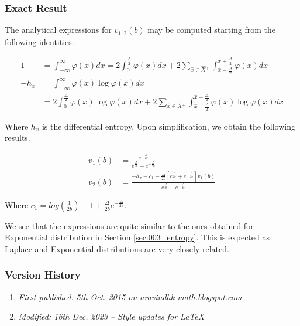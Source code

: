\subsubsection{Exact Result}

The analytical expressions for $v_{1,2}(b)$ may be computed starting from the following identities.

\begin{align} 1 &= \int_{-\infty}^{\infty} \varphi(x) dx = 2 \int_{0}^{\frac{\Delta}{2}} \varphi(x) dx + 2 \sum_{\hat{x} \in \hat{X}{}^+} \int_{\hat{x} - \frac{\Delta}{2}}^{\hat{x} + \frac{\Delta}{2}} \varphi(x) dx \\ -h_x &= \int_{-\infty}^{\infty} \varphi(x) \log \varphi(x) dx  \nonumber\\ &= 2 \int_{0}^{\frac{\Delta}{2}} \varphi(x) \log \varphi(x) dx + 2 \sum_{\hat{x} \in \hat{X}{}^+} \int_{\hat{x} - \frac{\Delta}{2}}^{\hat{x} + \frac{\Delta}{2}} \varphi(x) \log \varphi(x) dx \end{align}

Where $h_x$ is the differential entropy. Upon simplification, we obtain the following results.

\begin{align} v_1(b) &= \frac{e^{-\frac{\Delta}{2b}}}{e^{\frac{\Delta}{2b}} - e^{-\frac{\Delta}{2b}}} \\ v_2(b) &= \frac{-h_x - c_1 - \frac{\Delta}{2b} \left[ e^{\frac{\Delta}{2b}} + e^{-\frac{\Delta}{2b}} \right] v_1(b)}{e^{\frac{\Delta}{2b}} - e^{-\frac{\Delta}{2b}}}\end{align}

Where $c_1 = log\left(\frac{1}{2b}\right) - 1 + \frac{\Delta}{2b}e^{-\frac{\Delta}{2b}}$.

We see that the expressions are quite similar to the ones obtained for Exponential distribution in Section \ref{sec:003_entropy}. This is expected as Laplace and Exponential distributions are very closely related.

\subsubsection{Version History}
\begin{enumerate}
	\item \emph{First published: 5th Oct. 2015 on aravindhk-math.blogspot.com}
	\item \emph{Modified: 16th Dec. 2023 -- Style updates for \LaTeX}
\end{enumerate}


